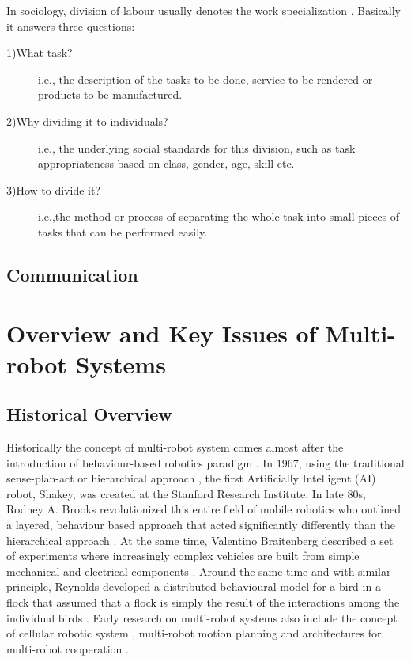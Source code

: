 In sociology, division of labour usually denotes the work specialization \cite{Sayer+1992}. Basically it answers three questions:
\begin{description}
\item[1)What task?] i.e., the description of the tasks to be done, service to be rendered or products to be manufactured.
\item[2)Why dividing it to individuals?] i.e., the underlying social standards for this division, such as task appropriateness based on class, gender, age, skill etc.
\item[3)How to divide it?] i.e.,the method or process of separating the whole task into small pieces of tasks that can be performed easily. 
\end{description}
\subsection{Communication} 
\section{Overview and Key Issues of Multi-robot Systems}
\label{sec:mrs}
\subsection*{Historical Overview}
Historically the concept of multi-robot system comes almost after the introduction of behaviour-based robotics paradigm \cite{Brooks1986,Arkin1990}. In 1967, using the traditional sense-plan-act or hierarchical approach \cite{Murphy2000}, the first Artificially Intelligent (AI) robot, Shakey, was created at the Stanford Research Institute.  In late 80s, Rodney A.  Brooks revolutionized this entire field of mobile robotics who outlined a layered, behaviour based approach that acted significantly differently than the hierarchical approach \cite{Brooks1986}. At the same time, Valentino Braitenberg described a set of experiments where increasingly complex vehicles are built from simple mechanical and electrical components \cite{Braitenberg1984}. Around the same time and with similar principle, Reynolds  developed a distributed behavioural model  for a bird in a flock  that assumed that a flock is simply the result  of the interactions among the individual birds \cite{Reynolds1987}. Early research on multi-robot  systems also include the concept of cellular robotic system \cite{Fukuda+1987}, \cite{Beni1988} multi-robot motion planning \cite{Arai+1989,Premvuti+1990,Wang1989} and architectures for multi-robot cooperation \cite{Asama+1989}.

